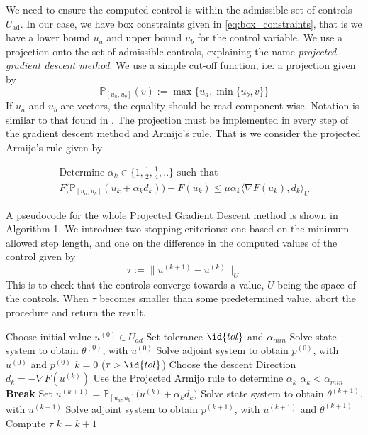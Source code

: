 We need to ensure the computed control is within the admissible set of controls $U_{\textrm{ad}}$. In our case, we have box constraints given in \eqref{eq:box_constraints}, that is we have a lower bound $u_a$ and upper bound $u_b$ for the control variable. We use a projection onto the set of admissible controls, explaining the name \emph{projected gradient descent method}. We use a simple cut-off function, i.e. a projection given by
\begin{equation}
    \label{eq:projection}
    \mathbb{P}_{[u_a,u_b]}(v) := \max \{u_a, \min \{u_b,v \} \}
\end{equation}
If $u_a$ and $u_b$ are vectors, the equality should be read component-wise. Notation is similar to that found in \cite{Algorithms}. The projection must be implemented in every step of the gradient descent method and Armijo's rule. That is we consider the projected Armijo's rule given by 

\begin{align*}
    \text{Determine $\alpha_k \in \{1, \frac{1}{2},\frac{1}{4},.. \}$ such that }\\
    F \bigg (\mathbb{P}_{[u_a,u_b]}(u_k + \alpha_kd_k) \bigg ) - F(u_k) \leq \mu \alpha_k \langle \nabla F(u_k),d_k \rangle_{U}
\end{align*}


A pseudocode for the whole Projected Gradient Descent method is shown in Algorithm 1. We introduce two stopping criterions: one based on the minimum allowed step length, and one on the difference in the computed values of the control given by 
\begin{equation}
    \label{eq:stopping}
    \tau := \|u^{(k+1)} - u^{(k)}\|_U 
\end{equation}
This is to check that the controls converge towards a value, $U$ being the space of the controls. When $\tau$ becomes smaller than some predetermined value, abort the procedure and return the result.


\begin{codebox}
\li Choose initial value $u^{(0)}\in U_{ad}$
\li Set tolerance $\id{tol}$ and $\alpha_{min}$
\li Solve state system to obtain $\theta^{(0)}$, with $u^{(0)}$
\li Solve adjoint system to obtain $p^{(0)}$, with $u^{(0)}$ and $p^{(0)}$
\li $k=0$
\li \While ($\tau > \id{tol}$)  \Then
\li Choose the descent Direction $d_k = -\nabla F(u^{(k)})$
\li Use the Projected Armijo rule to determine $\alpha_k$
\li \If $\alpha_k < \alpha_{min}$ \Then 
\li \textbf{Break} \End
\li Set $u^{(k+1)} = \mathbb{P}_{[u_a,u_b]}\bigg (u^{(k)} + \alpha_k d_k \bigg )$
\li Solve state system to obtain $\theta^{(k+1)}$, with $u^{(k+1)}$
\li Solve adjoint system to obtain $p^{(k+1)}$, with $u^{(k+1)}$ and $\theta^{(k+1)}$
\li Compute $\tau$
\li $k = k +1$
\end{codebox}

